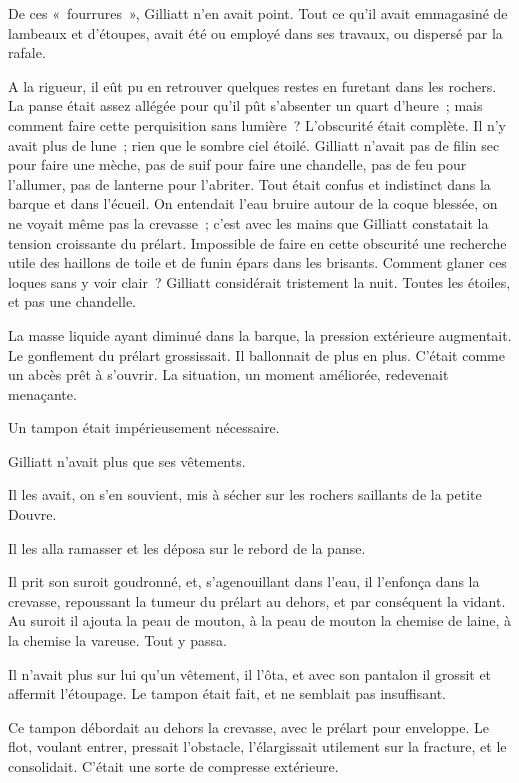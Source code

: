\documentclass[french,twoside]{book} %
\begin{document}
De ces « fourrures », Gilliatt n’en avait point. Tout ce qu’il avait emmagasiné de lambeaux et d’étoupes, avait été ou employé dans ses travaux, ou dispersé par la rafale.\par
A la rigueur, il eût pu en retrouver quelques restes  en furetant dans les rochers. La panse était assez allégée pour qu’il pût s’absenter un quart d’heure ; mais comment faire cette perquisition sans lumière ? L’obscurité était complète. Il n’y avait plus de lune ; rien que le sombre ciel étoilé. Gilliatt n’avait pas de filin sec pour faire une mèche, pas de suif pour faire une chandelle, pas de feu pour l’allumer, pas de lanterne pour l’abriter. Tout était confus et indistinct dans la barque et dans l’écueil. On entendait l’eau bruire autour de la coque blessée, on ne voyait même pas la crevasse ; c’est avec les mains que Gilliatt constatait la tension croissante du prélart. Impossible de faire en cette obscurité une recherche utile des haillons de toile et de funin épars dans les brisants. Comment glaner ces loques sans y voir clair ? Gilliatt considérait tristement la nuit. Toutes les étoiles, et pas une chandelle.\par
La masse liquide ayant diminué dans la barque, la pression extérieure augmentait. Le gonflement du prélart grossissait. Il ballonnait de plus en plus. C’était comme un abcès prêt à s’ouvrir. La situation, un moment améliorée, redevenait menaçante.\par
Un tampon était impérieusement nécessaire.\par
Gilliatt n’avait plus que ses vêtements.\par
Il les avait, on s’en souvient, mis à sécher sur les rochers saillants de la petite Douvre.\par
Il les alla ramasser et les déposa sur le rebord de la panse.\par
Il prit son suroit goudronné, et, s’agenouillant dans l’eau, il l’enfonça dans la crevasse, repoussant la  tumeur du prélart au dehors, et par conséquent la vidant. Au suroit il ajouta la peau de mouton, à la peau de mouton la chemise de laine, à la chemise la vareuse. Tout y passa.\par
Il n’avait plus sur lui qu’un vêtement, il l’ôta, et avec son pantalon il grossit et affermit l’étoupage. Le tampon était fait, et ne semblait pas insuffisant.\par
Ce tampon débordait au dehors la crevasse, avec le prélart pour enveloppe. Le flot, voulant entrer, pressait l’obstacle, l’élargissait utilement sur la fracture, et le consolidait. C’était une sorte de compresse extérieure.\par
\end{document}
